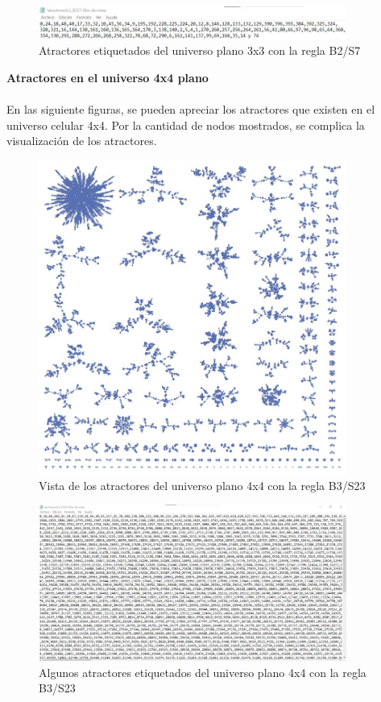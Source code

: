 \documentclass[12pt,a4paper]{book}
\begin{document}
\begin{figure}[H]
	\centering
	\includegraphics[width=0.9\textwidth]{imagen20PC}
	\caption{Atractores etiquetados del universo plano 3x3 con la regla B2/S7}
\end{figure}
\textbf{Atractores en el universo 4x4 plano}
\\\\
En las siguiente figuras, se pueden apreciar los atractores que existen en el universo celular 4x4. Por la cantidad de nodos mostrados, se complica la visualización de los atractores.
\begin{figure}[H]
	\centering
	\includegraphics[width=0.9\textwidth]{imagen21PC}
	\caption{Vista de los atractores del universo plano 4x4 con la regla B3/S23}
\end{figure}
\begin{figure}[H]
	\centering
	\includegraphics[width=0.9\textwidth]{imagen22PC}
	\caption{Algunos atractores etiquetados del universo plano 4x4 con la regla B3/S23}
\end{figure}
\end{document}
